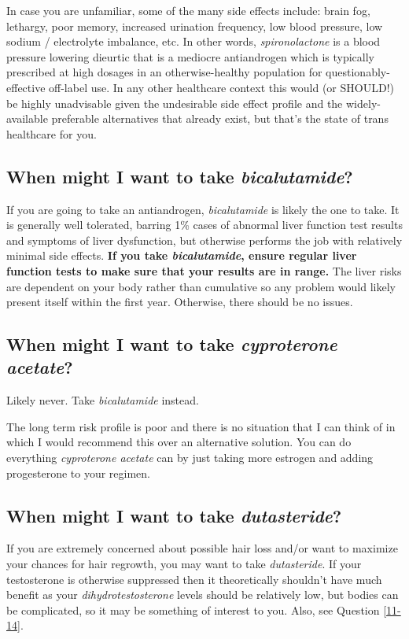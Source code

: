 \documentclass{article}
\begin{document}
In case you are unfamiliar, some of the many side effects include: brain fog, lethargy, poor memory, increased urination frequency, low blood pressure, low sodium / electrolyte imbalance, etc. In other words, \textit{spironolactone} is a blood pressure lowering dieurtic that is a mediocre antiandrogen which is typically prescribed at high dosages in an otherwise-healthy population for questionably-effective off-label use. In any other healthcare context this would (or SHOULD!) be highly unadvisable given the undesirable side effect profile and the widely-available preferable alternatives that already exist, but that's the state of trans healthcare for you.

\subsection{When might I want to take \textit{bicalutamide}?}

If you are going to take an antiandrogen, \textit{bicalutamide} is likely the one to take. It is generally well tolerated, barring 1\% cases of abnormal liver function test results and symptoms of liver dysfunction, but otherwise performs the job with relatively minimal side effects. \textbf{If you take \textit{bicalutamide}, ensure regular liver function tests to make sure that your results are in range. }The liver risks are dependent on your body rather than cumulative so any problem would likely present itself within the first year. Otherwise, there should be no issues. 

\subsection{When might I want to take \textit{cyproterone acetate}?}

Likely never. Take \textit{bicalutamide} instead.

The long term risk profile is poor and there is no situation that I can think of in which I would recommend this over an alternative solution. You can do everything \textit{cyproterone acetate} can by just taking more estrogen and adding progesterone to your regimen.

\subsection{When might I want to take \textit{dutasteride}?}

If you are extremely concerned about possible hair loss and/or want to maximize your chances for hair regrowth, you may want to take \textit{dutasteride}. If your testosterone is otherwise suppressed then it theoretically shouldn’t have much benefit as your \textit{dihydrotestosterone} levels should be relatively low, but bodies can be complicated, so it may be something of interest to you. Also, see Question \ref{11-14}.
\end{document}
